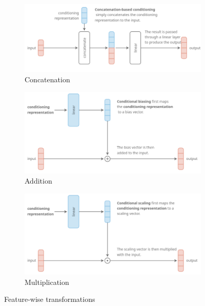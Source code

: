 \documentclass[12pt, a4paper]{article}
\begin{document}
\begin{figure}[h!]
    \centering
    \begin{subfigure}[t]{0.48\textwidth}
        \centering
        \includegraphics[width=\textwidth]{concat.png}
        \caption{Concatenation}
        \label{}
    \end{subfigure}
    \hfill
    \begin{subfigure}[t]{0.48\textwidth}
        \centering
        \includegraphics[width=\textwidth]{add.png}
        \caption{Addition}
        \label{}
    \end{subfigure}
    \begin{subfigure}[b]{.48\textwidth}
        \centering
        \includegraphics[width=\textwidth]{mul.png}
        \caption{Multiplication}
        \label{}
    \end{subfigure}    
    \caption{Feature-wise transformations \cite{ruderOverviewMultiTaskLearning2017}}
    \label{}
\end{figure}
\end{document}
